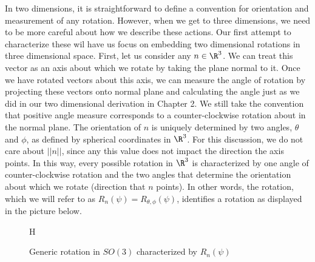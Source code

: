 In two dimensions, it is straightforward to define a convention for orientation and measurement of any rotation. However, when we get to three dimensions, we need to be more careful about how we describe these actions. Our first attempt to characterize these wil have us focus on embedding two dimensional rotations in three dimensional space. First, let us consider any $n\in\R^3$. We can treat this vector as an axis about which we rotate by taking the plane normal to it. Once we have rotated vectors about this axis, we can measure the angle of rotation by projecting these vectors onto normal plane and calculating the angle just as we did in our two dimensional derivation in Chapter 2. We still take the convention that positive angle measure corresponds to a counter-clockwise rotation about in the normal plane. The orientation of $n$ is uniquely determined by two angles, $\theta$ and $\phi$, as defined by spherical coordinates in $\R^3$. For this discussion, we do not care about $||n||$, since any this value does not impact the direction the axis points. In this way, every possible rotation in $\R^3$ is characterized by one angle of counter-clockwise rotation and the two angles that determine the orientation about which we rotate (direction that $n$ points). In other words, the rotation, which we will refer to as $R_n(\psi) = R_{\theta,\phi}(\psi)$, identifies a rotation as displayed in the picture below.


\begin{figure}{H}
	\centering
	\centering
	\caption{Generic rotation in $SO(3)$ characterized by $R_n(\psi)$}		
\end{figure}

